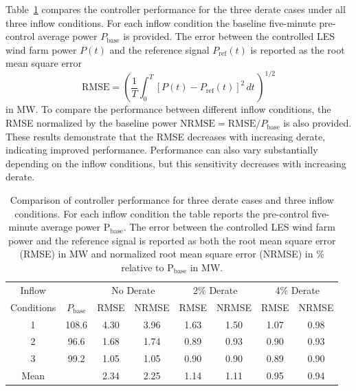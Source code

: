 Table~\ref{tab:rmse} compares the controller performance for the three derate cases under all three inflow conditions. For each inflow condition the baseline five-minute pre-control average power $P_\text{base}$ is provided. The error between the controlled LES wind farm power $P(t)$ and the reference signal $P_\text{ref}(t)$ is reported as the root mean square error 
\begin{equation}
\text{RMSE} = \left(\frac{1}{T} \int_0^T [P(t) - P_\text{ref}(t)]^2 \, dt\,\right)^{1/2}
\end{equation}
 in MW. To compare the performance between different inflow conditions, the RMSE normalized by the baseline power $\text{NRMSE} = \text{RMSE}/P_\text{base}$ is also provided. These results demonstrate that the RMSE decreases with increasing derate, indicating improved performance. Performance can also vary substantially depending on the inflow conditions, but this sensitivity decreases with increasing derate. 
 
\begin{table}
\caption{Comparison of controller performance for three derate cases and three inflow conditions. For each inflow condition the table reports the pre-control five-minute average power $\text{P}_\text{base}$. The error between the controlled LES wind farm power and the reference signal is reported as both the root mean square error (RMSE) in MW and normalized root mean square error (NRMSE) in \% relative to $\text{P}_\text{base}$ in MW.}
\label{tab:rmse}
\centering
\small
\begin{tabular}{c c c c c c c c}
\toprule
Inflow & & \multicolumn{2}{c}{No Derate} & \multicolumn{2}{c}{2\% Derate} & \multicolumn{2}{c}{4\% Derate} \\
Conditions & $P_{\text{base}}$  & RMSE  & NRMSE & RMSE & NRMSE & RMSE & NRMSE  \\
\midrule
1 & 108.6 & 4.30 & 3.96 & 1.63 & 1.50 & 1.07 & 0.98 \\
2 & 96.6 & 1.68 & 1.74 & 0.89 & 0.93 & 0.90 & 0.93 \\
3 & 99.2 & 1.05 & 1.05 & 0.90 & 0.90 & 0.89 & 0.90 \\
\midrule
Mean & & 2.34 & 2.25 & 1.14 & 1.11 & 0.95 & 0.94 \\
\bottomrule
\end{tabular}
\end{table}

